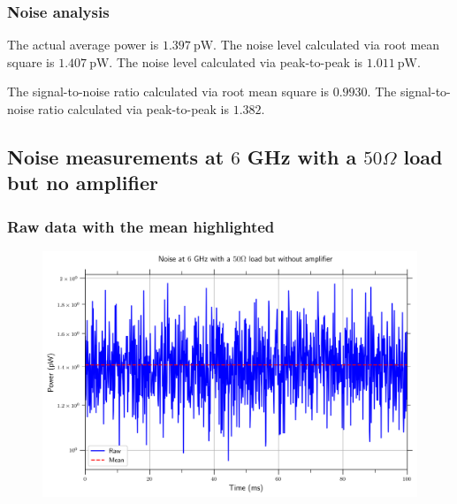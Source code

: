 \documentclass[english,12pt,a4paper]{article}
\begin{document}
\hypertarget{noise-analysis}{%
	\subsubsection{Noise analysis}\label{noise-analysis_1}}

	The actual average power is $\qty{1.397}{\pico\watt}$.
	The noise level calculated via root mean square is $\qty{1.407}{\pico\watt}$.
	The noise level calculated via peak-to-peak is $\qty{1.011}{\pico\watt}$.
	
	The signal-to-noise ratio calculated via root mean square is $0.9930$.
	The signal-to-noise ratio calculated via peak-to-peak is $1.382$.


\hypertarget{noise-measurements-at-6-ghz-with-a-50-omega-load-but-no-amplifier}{%
	\subsection{\texorpdfstring{Noise measurements at \(6\) GHz with a
			\(50 \Omega\) load but no
			amplifier}{Noise measurements at 6 GHz with a 50 \textbackslash Omega load but no amplifier}}\label{noise-measurements-at-6-ghz-with-a-50-omega-load-but-no-amplifier}}



\hypertarget{raw-data-with-the-mean-highlighted}{%
	\subsubsection{Raw data with the mean
		highlighted}\label{raw-data-with-the-mean-highlighted-6}}

\begin{figure}[H]
	\includegraphics[width=1\linewidth]{Plots/noise_floor_6_GHz_50ohm}
	\caption[Noise measurements at 6 GHz with a 50 Ohm load]{}
	\label{fig:noisefloor6ghz50ohm}
\end{figure}
\end{document}

